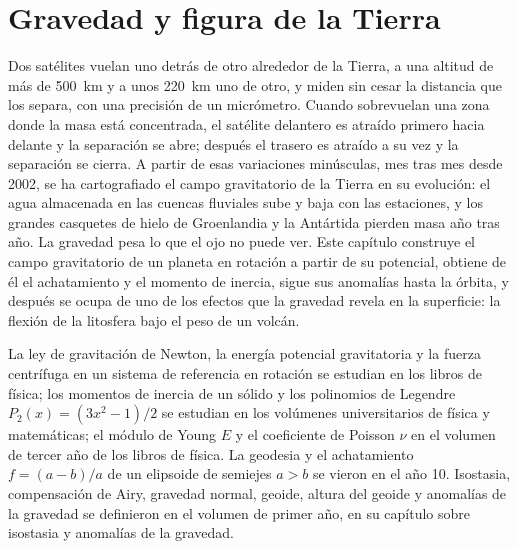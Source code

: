 \chapter{Gravedad y figura de la Tierra}\label{ch:b3:gravity-geodesy}

Dos satélites vuelan uno detrás de otro alrededor de la Tierra, a una altitud de más
de \qty{500}{km} y a unos \qty{220}{km} uno de otro, y miden sin cesar la distancia
que los separa, con una precisión de un micrómetro.
Cuando sobrevuelan una zona donde la masa está concentrada, el satélite delantero
es atraído primero hacia delante y la separación se abre; después el trasero es atraído
a su vez y la separación se cierra. A partir de esas variaciones minúsculas, mes tras mes desde 2002,
se ha cartografiado el campo gravitatorio de la Tierra en su evolución: el agua almacenada en
las cuencas fluviales sube y baja con las estaciones, y los grandes casquetes de hielo de
Groenlandia y la Antártida pierden masa año tras año. La gravedad pesa lo que el ojo
no puede ver. Este capítulo construye el campo gravitatorio de un planeta en rotación a partir de su
potencial, obtiene de él el achatamiento y el momento de inercia, sigue sus
anomalías hasta la órbita, y después se ocupa de uno de los efectos que la gravedad revela en
la superficie: la flexión de la litosfera bajo el peso de un volcán.

\begin{recall}
La ley de gravitación de Newton, la energía potencial gravitatoria y la
fuerza centrífuga en un sistema de referencia en rotación se estudian en los libros de física; los momentos de
inercia de un sólido y los polinomios de Legendre $P_2(x) = (3x^2 - 1)/2$ se estudian en
los volúmenes universitarios de física y matemáticas; el módulo de Young $E$ y
el coeficiente de Poisson $\nu$ en el volumen de tercer año de los libros de física. La geodesia y el
achatamiento $f = (a - b)/a$ de un elipsoide de semiejes $a > b$ se vieron en el
año 10. Isostasia, compensación de Airy, gravedad normal, geoide, altura del geoide y
anomalías de la gravedad se definieron en el volumen de primer año, en su
capítulo sobre isostasia y anomalías de la gravedad.
\end{recall}

